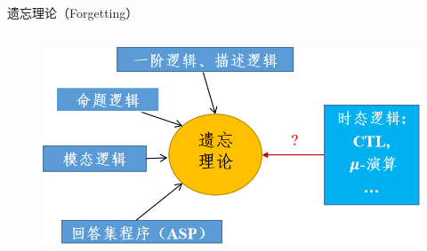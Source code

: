 \documentclass[aspectratio=1610, 9pt, CJK]{beamer}
\begin{document}
\begin{frame}
{\begin{block}{遗忘理论（Forgetting）}
\begin{columns}
				\begin{figure}
					\includegraphics[scale=0.35]{figures/forgetting}
				\end{figure}
			\end{columns}
		\end{block}}
\end{frame}
\end{document}
